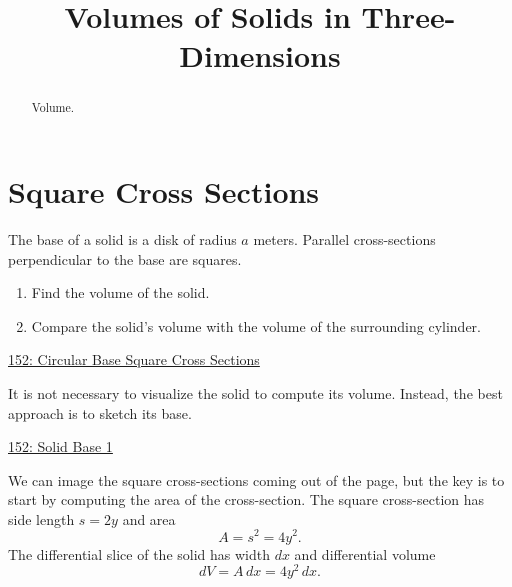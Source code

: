 \documentclass{ximera}
\title{Volumes of Solids in Three-Dimensions}
\begin{document}
\begin{abstract}
Volume.
\end{abstract}
\maketitle

\section{Square Cross Sections}

\begin{question} \label{QPkdf9fM}
The base of a solid is a disk of radius $a$ meters. Parallel cross-sections perpendicular to the base are squares. 

\begin{enumerate}
\item Find the volume of the solid.
\item Compare the solid's volume with the volume of the surrounding cylinder.
\end{enumerate}

\begin{onlineOnly}
    \begin{center}
\end{center}
\end{onlineOnly}

\href{https://www.desmos.com/3d/q5jo9tip5q}{152: Circular Base Square Cross Sections}



\begin{explanation}

\item It is not necessary to visualize the solid to compute its volume. Instead, the best approach is to sketch its base.

\begin{onlineOnly}
    \begin{center}
\end{center}
\end{onlineOnly}

\href{ https://www.desmos.com/calculator/mnjevsoffp}{152: Solid Base 1}

We can image the square cross-sections coming out of the page, but the key is to start by computing the area of the cross-section. The square cross-section has side length $s=2y$ and area
\[ 
 A = s^2 = 4y^2 .
\]
The differential slice of the solid has width $dx$ and differential volume
\[
    dV = A \, dx = 4y^2 \, dx .
\]


\end{explanation}
\end{question}
\end{document}
